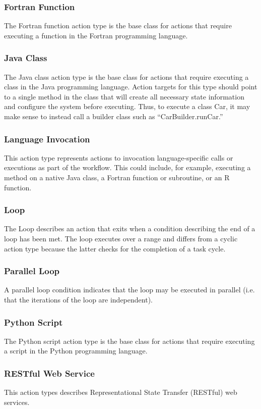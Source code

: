 \subsubsection{ Fortran Function } The Fortran function action type is the base
class for actions that require executing a function in the Fortran programming
language.
\subsubsection{ Java Class } The Java class action type is the base class for
actions that require executing a class in the Java programming language. Action
targets for this type should point to a single method in the class that will
create all necessary state information and configure the system before
executing. Thus, to execute a class Car, it may make sense to instead call a
builder class such as ``CarBuilder.runCar.''
\subsubsection{ Language Invocation } This action type represents actions to
invocation language-specific calls or executions as part of the workflow. This
could include, for example, executing a method on a native Java class, a
Fortran function or subroutine, or an R function.
\subsubsection{ Loop } The Loop describes an action that exits when a condition
describing the end of a loop has been met. The loop executes over a range and
differs from a cyclic action type because the latter checks for the completion
of a task cycle.
\subsubsection{ Parallel Loop } A parallel loop condition indicates that the
loop may be executed in parallel (i.e. that the iterations of the loop are
independent).
\subsubsection{ Python Script } The Python script action type is the base class
for actions that require executing a script in the Python programming language.
\subsubsection{ RESTful Web Service } This action types describes
Representational State Transfer (RESTful) web services.
